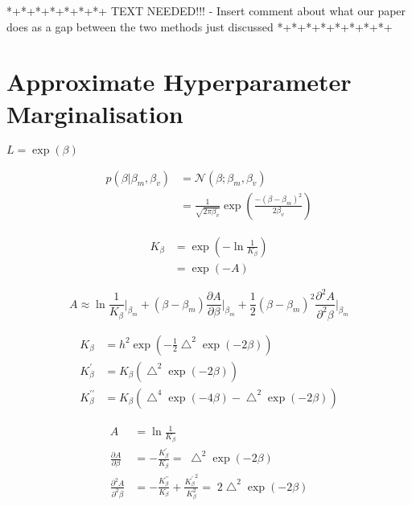 \documentclass{article}
\begin{document}
*+*+*+*+*+*+*+ TEXT NEEDED!!! - Insert comment about what our paper does as a gap between the two methods just discussed *+*+*+*+*+*+*+*+

\section{Approximate Hyperparameter Marginalisation}

$L = \exp(\beta)$

\begin{align}
p(\beta|\beta_m,\beta_v) &= \mathcal{N}(\beta; \beta_m, \beta_v)\\
&= \frac{1}{\sqrt{2 \pi \beta_v}} \exp \left( \frac{ -(\beta - \beta_m)^2}{2\beta_v} \right)
\end{align}

\begin{align}
K_\beta &= \exp \left( -\ln \frac{1}{K_\beta} \right)\\ 
&= \exp \left( -A \right)
\end{align}


\begin{equation} \label{taylorexpansion}
A \approx \ln \frac{1}{K_{\beta}}\bigg|_{\beta_m} + (\beta-\beta_m) \frac{\partial{A}}{\partial{\beta}}\bigg|_{\beta_m} + \frac{1}{2}(\beta-\beta_m)^2 \frac{\partial^2{A}}{\partial^2{\beta}}\bigg|_{\beta_m}
\end{equation}

\begin{align}%
K_\beta &= h^2 \exp\left( -\frac{1}{2}\bigtriangleup^2 \exp(-2\beta) \right)\\
K^\prime_\beta &= K_\beta \left( \bigtriangleup^2 \exp(-2\beta)  \right) \\
K^{\prime\prime}_\beta &= K_\beta \left( \bigtriangleup^4 \exp(-4\beta) -  \bigtriangleup^2 \exp(-2\beta) \right)
\end{align}

\begin{align}
A &= \ln \frac{1}{K_\beta} \\
\frac{\partial{A}}{\partial{\beta}} &= -\frac{K^\prime_\beta}{K_\beta} = \; \bigtriangleup^2 \exp(-2\beta)\\
\frac{\partial^2{A}}{\partial^2{\beta}} &= -\frac{K^{\prime\prime}_\beta}{K_\beta} + \frac{{K^\prime_\beta}^2}{K_\beta^2} = \; 2 \bigtriangleup^2 \exp(-2\beta)
\end{align}
\end{document}

